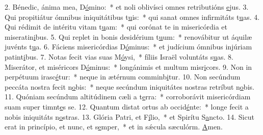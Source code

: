 2. Bénedic, ánima mea, D\uline{ó}mino:~* et noli oblivísci omnes retributións \uline{e}jus.
3. Qui propitiátur ómnibus iniquitátibus t\uline{u}is:~* qui sanat omnes infirmitáts t\uline{u}as.
4. Qui rédimit de intéritu vitam t\uline{u}am:~* qui corónat te in misericórdia et miseratin\uline{i}bus.
5. Qui replet in bonis desidérium t\uline{u}um:~* renovábitur ut áquilæ juvénts t\uline{u}a.
6. Fáciens misericórdias D\uline{ó}minus:~* et judícium ómnibus injúriam patint\uline{i}bus.
7. Notas fecit vias suas M\uline{ó}ysi,~* fíliis Israël voluntáts s\uline{u}as.
8. Miserátor, et miséricors D\uline{ó}minus:~* longánimis et multum misr\uline{i}cors.
9. Non in perpétuum irasc\uline{é}tur:~* neque in ætérnum comminb\uline{i}tur.
10. Non secúndum peccáta nostra fecit n\uline{o}bis:~* neque secúndum iniquitátes nostras retríbut n\uline{o}bis.
11. Quóniam secúndum altitúdinem cæli a t\uline{e}rra:~* corroborávit misericórdiam suam super timnt\uline{e}s se.
12. Quantum distat ortus ab occid\uline{é}nte:~* longe fecit a nobis iniquitáts n\uline{o}stras.
13. Glória Patri, et F\uline{í}lio,~* et Spirítu S\uline{a}ncto.
14. Sicut erat in princípio, et nunc, et s\uline{e}mper,~* et in sǽcula sæculórm. \uline{A}men.
